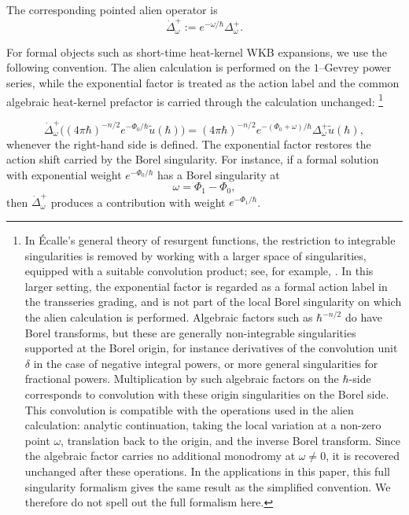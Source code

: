 \documentclass[11pt]{amsart}
\theoremstyle{plain}
\theoremstyle{definition}
\begin{document}
The corresponding pointed alien operator is
\begin{equation}\label{eq:pointed-positive-alien-operator}
\dot\Delta_{\omega}^{+}
:=e^{-\omega/\hbar}\Delta_{\omega}^{+}.
\end{equation}

For formal objects such as short-time heat-kernel WKB expansions, we use the
following convention.  The alien calculation is performed on the 
$1$--Gevrey power series, while the exponential factor is treated as the action
label and the common algebraic heat-kernel prefactor is carried through the
calculation unchanged: \footnote{In \'Ecalle's general theory
of resurgent functions, the restriction to integrable singularities is
removed by working with a larger space of singularities, equipped with a
suitable convolution product; see, for example,
\cite{Ecalle1981I,SauzinSplitting}.  In this larger setting, the exponential
factor is regarded as a formal action label in the transseries grading, and
is not part of the local Borel singularity on which the alien calculation is
performed.  Algebraic factors such as $\hbar^{-n/2}$ do have Borel
transforms, but these are generally non-integrable singularities supported at
the Borel origin, for instance derivatives of the convolution unit $\delta$
in the case of negative integral powers, or more general 
singularities for fractional powers.  Multiplication by such algebraic
factors on the $\hbar$-side corresponds to convolution with these origin
singularities on the Borel side.  This convolution is compatible with the
operations used in the alien calculation: analytic continuation, taking the
local variation at a non-zero point $\omega$, translation back to the
origin, and the inverse Borel transform.  Since the algebraic factor carries
no additional monodromy at $\omega\neq0$, it is recovered unchanged after
these operations. In the applications in this paper, this full singularity formalism gives the same
result as the simplified convention.
We therefore do not spell out the full formalism here.}

\[
\dot\Delta_\omega^+\big(
(4\pi\hbar)^{-n/2}
e^{-\Phi_0/\hbar}
\widetilde u(\hbar)\big)
=
(4\pi\hbar)^{-n/2}
e^{-(\Phi_0+\omega)/\hbar}
\Delta_\omega^+\widetilde u(\hbar),
\]
whenever the right-hand side is defined. The exponential factor restores the action shift carried by the Borel
singularity.  For instance, if a formal solution with exponential weight
$e^{-\Phi_0/\hbar}$ has a Borel singularity at
\[
\omega=\Phi_1-\Phi_0,
\]
then $\dot\Delta_{\omega}^{+}$ produces a contribution with weight $e^{-\Phi_1/\hbar}$.
\end{document}
